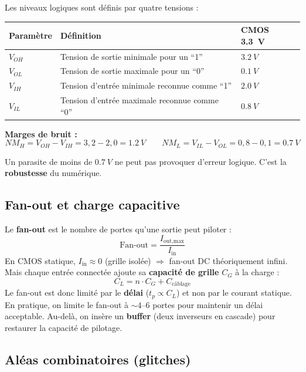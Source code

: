 \documentclass[12pt,a4paper,twoside]{book}
\begin{document}
\begin{formule}
Les niveaux logiques sont définis par quatre tensions :

\begin{center}
\renewcommand{\arraystretch}{1.3}
\begin{tabular}{lp{7cm}l}
\toprule
\textbf{Paramètre} & \textbf{Définition} & \textbf{CMOS \SI{3.3}{V}} \\
\midrule
$V_{OH}$ & Tension de sortie minimale pour un ``1'' & $\SI{3.2}{V}$ \\
$V_{OL}$ & Tension de sortie maximale pour un ``0'' & $\SI{0.1}{V}$ \\
$V_{IH}$ & Tension d'entrée minimale reconnue comme ``1'' & $\SI{2.0}{V}$ \\
$V_{IL}$ & Tension d'entrée maximale reconnue comme ``0'' & $\SI{0.8}{V}$ \\
\bottomrule
\end{tabular}
\end{center}

\textbf{Marges de bruit :}
\[
NM_H = V_{OH} - V_{IH} = 3{,}2 - 2{,}0 = \SI{1.2}{V} \qquad NM_L = V_{IL} - V_{OL} = 0{,}8 - 0{,}1 = \SI{0.7}{V}
\]

Un parasite de moins de $\SI{0.7}{V}$ ne peut pas provoquer d'erreur logique. C'est la \textbf{robustesse} du numérique.
\end{formule}

\subsection{Fan-out et charge capacitive}

\begin{formule}
Le \textbf{fan-out} est le nombre de portes qu'une sortie peut piloter :
\[
\text{Fan-out} = \frac{I_{\text{out,max}}}{I_{\text{in}}}
\]
En CMOS statique, $I_{\text{in}} \approx 0$ (grille isolée) $\Rightarrow$ fan-out DC théoriquement infini. Mais chaque entrée connectée ajoute sa \textbf{capacité de grille} $C_G$ à la charge :
\[
C_L = n \cdot C_G + C_{\text{câblage}}
\]
Le fan-out est donc limité par le \textbf{délai} ($t_p \propto C_L$) et non par le courant statique. En pratique, on limite le fan-out à $\sim 4$--$6$ portes pour maintenir un délai acceptable. Au-delà, on insère un \textbf{buffer} (deux inverseurs en cascade) pour restaurer la capacité de pilotage.
\end{formule}

\subsection{Aléas combinatoires (glitches)}
\end{document}
